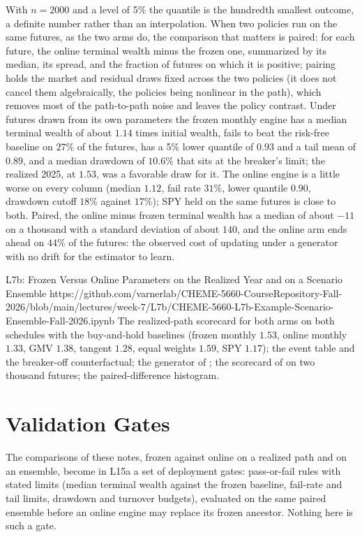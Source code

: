 \documentclass[11pt]{article}
\begin{document}
With $n=2000$ and a level of 5\% the quantile is the hundredth smallest outcome, a definite number rather than an interpolation. When two policies run on the same futures, as the two arms do, the comparison that matters is paired: for each future, the online terminal wealth minus the frozen one, summarized by its median, its spread, and the fraction of futures on which it is positive; pairing holds the market and residual draws fixed across the two policies (it does not cancel them algebraically, the policies being nonlinear in the path), which removes most of the path-to-path noise and leaves the policy contrast. Under futures drawn from its own parameters the frozen monthly engine has a median terminal wealth of about $1.14$ times initial wealth, fails to beat the risk-free baseline on $27\%$ of the futures, has a 5\% lower quantile of $0.93$ and a tail mean of $0.89$, and a median drawdown of $10.6\%$ that sits at the breaker's limit; the realized 2025, at $1.53$, was a favorable draw for it. The online engine is a little worse on every column (median $1.12$, fail rate $31\%$, lower quantile $0.90$, drawdown cutoff $18\%$ against $17\%$); SPY held on the same futures is close to both. Paired, the online minus frozen terminal wealth has a median of about $-11$ on a thousand with a standard deviation of about $140$, and the online arm ends ahead on $44\%$ of the futures: the observed cost of updating under a generator with no drift for the estimator to learn.

\notebooklink
  {L7b: Frozen Versus Online Parameters on the Realized Year and on a Scenario Ensemble}
  {https://github.com/varnerlab/CHEME-5660-CourseRepository-Fall-2026/blob/main/lectures/week-7/L7b/CHEME-5660-L7b-Example-Scenario-Ensemble-Fall-2026.ipynb}
  {The realized-path scorecard for both arms on both schedules with the buy-and-hold baselines (frozen monthly $1.53$, online monthly $1.33$, GMV $1.38$, tangent $1.28$, equal weights $1.59$, SPY $1.17$); the event table and the breaker-off counterfactual; the generator of ; the scorecard of  on two thousand futures; the paired-difference histogram.}

\section{Validation Gates}

The comparisons of these notes, frozen against online on a realized path and on an ensemble, become in L15a a set of deployment gates: pass-or-fail rules with stated limits (median terminal wealth against the frozen baseline, fail-rate and tail limits, drawdown and turnover budgets), evaluated on the same paired ensemble before an online engine may replace its frozen ancestor. Nothing here is such a gate.
\end{document}
